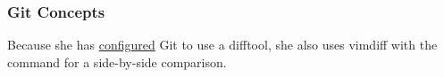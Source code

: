 \begin{frame}[fragile]\frametitle{Git Concepts}
    Because she has 
    \href{http://stackoverflow.com/questions/3713765/viewing%
    -all-git-diffs-with-vimdiff}{configured} 
    Git to use a difftool, 
    she also uses vimdiff with the command
    for a side-by-side comparison.

    \begin{center} 
        \begin{figure}[h!] \centering
        \end{figure}
    \end{center}
\end{frame}


